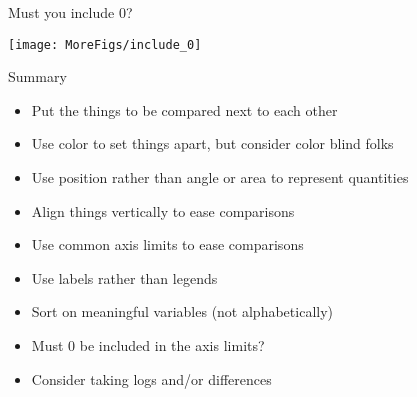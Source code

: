 \documentclass[12pt]{article}\usepackage[]{graphicx}\usepackage[]{color}
\makeatletter
\def\maxwidth{ %
  \ifdim\Gin@nat@width>\linewidth
    \linewidth
  \else
    \Gin@nat@width
  \fi
}
\newenvironment{knitrout}{}{} %
\newcommand{\headsize}{\fontsize{35}{35} \selectfont}
\newcommand{\smallestsize}{\fontsize{18}{22} \selectfont}
\makeatother
\begin{document}
\newpage


\headsize \color{myyellow}
\hfill
\begin{minipage}{6.25in}
\centering
Must you include 0?
\end{minipage}

\vfill

\begin{knitrout}
\color{fgcolor}

{\centering \texttt{[image: MoreFigs/include\_0]} 

}



\end{knitrout}






\newpage





\headsize \color{myyellow}
\hfill
\begin{minipage}{5.75in}
\centering
Summary
\end{minipage}

\vspace{30mm}

\smallestsize \color{mywhite}
\hspace{0.5in} \begin{minipage}{9.5in}

\begin{itemize}
\itemsep24pt

\item Put the things to be compared next to each other

\item Use color to set things apart, but consider color blind folks

\item Use position rather than angle or area to represent quantities

\item Align things vertically to ease comparisons

\item Use common axis limits to ease comparisons

\item Use labels rather than legends

\item Sort on meaningful variables (not alphabetically)

\item Must 0 be included in the axis limits?

\item Consider taking logs and/or differences

\end{itemize}

\end{minipage}
\end{document}
